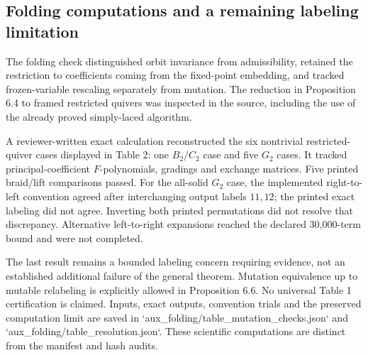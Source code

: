 \documentclass[10pt]{article}
\begin{document}
\subsection*{Folding computations and a remaining labeling limitation}
The folding check distinguished orbit invariance from admissibility, retained the restriction to coefficients coming from the fixed-point embedding, and tracked frozen-variable rescaling separately from mutation. The reduction in Proposition 6.4 to framed restricted quivers was inspected in the source, including the use of the already proved simply-laced algorithm.\par
A reviewer-written exact calculation reconstructed the six nontrivial restricted-quiver cases displayed in Table 2: one \(B_2/C_2\) case and five \(G_2\) cases. It tracked principal-coefficient \(F\)-polynomials, gradings and exchange matrices. Five printed braid/lift comparisons passed. For the all-solid \(G_2\) case, the implemented right-to-left convention agreed after interchanging output labels \(11,12\); the printed exact labeling did not agree. Inverting both printed permutations did not resolve that discrepancy. Alternative left-to-right expansions reached the declared 30,000-term bound and were not completed.\par
The last result remains a bounded labeling concern requiring evidence, not an established additional failure of the general theorem. Mutation equivalence up to mutable relabeling is explicitly allowed in Proposition 6.6. No universal Table 1 certification is claimed. Inputs, exact outputs, convention trials and the preserved computation limit are saved in `aux\_folding/table\_mutation\_checks.json` and `aux\_folding/table\_resolution.json`. These scientific computations are distinct from the manifest and hash audits.\par
\end{document}
